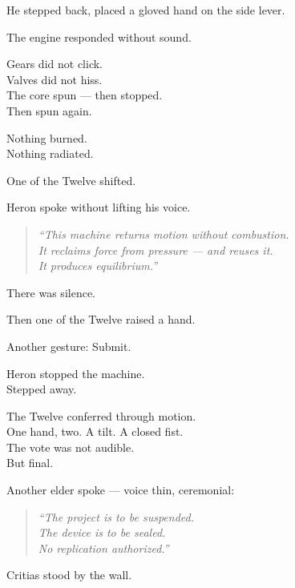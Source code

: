 \documentclass[12pt]{article}
\begin{document}
He stepped back, placed a gloved hand on the side lever.

The engine responded without sound.

Gears did not click.\\
Valves did not hiss.\\
The core spun — then stopped.\\
Then spun again.

Nothing burned.\\
Nothing radiated.

One of the Twelve shifted.

\vspace{1em}

Heron spoke without lifting his voice.

\begin{quote}
\textit{“This machine returns motion without combustion.\\
It reclaims force from pressure — and reuses it.\\
It produces equilibrium.”}
\end{quote}

\vspace{1em}

There was silence.

Then one of the Twelve raised a hand.

Another gesture: Submit.

\vspace{1em}

Heron stopped the machine.\\
Stepped away.

\vspace{1em}

The Twelve conferred through motion.\\
One hand, two. A tilt. A closed fist.\\
The vote was not audible.\\
But final.

Another elder spoke — voice thin, ceremonial:

\begin{quote}
\textit{“The project is to be suspended.\\
The device is to be sealed.\\
No replication authorized.”}
\end{quote}

\vspace{1em}

Critias stood by the wall.
\end{document}
